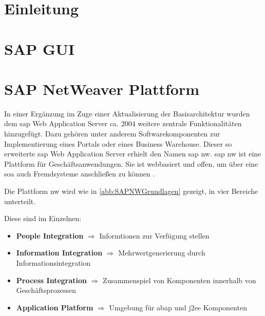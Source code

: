 \section{Einleitung}

\section{SAP GUI}
\label{sec:sapgui}

\section{SAP NetWeaver Plattform}
\label{sec:netweaver}
In einer Ergänzung im Zuge einer Aktualisierung der Basisarchitektur wurden dem \gls{sap} Web Application Server ca. 2004 weitere zentrale Funktionalitäten hinzugefügt. Dazu gehören unter anderem Softwarekomponenten zur Implementierung eines Portals oder eines Business Warehouse. Dieser so erweiterte \gls{sap} Web Application Server erhielt den Namen \gls{sap} \gls{nw}. \gls{sap} \gls{nw} ist eine Plattform für Geschäftsanwendungen. Sie ist webbasiert und offen, um über eine \gls{soa} auch Fremdsysteme anschließen zu können \cite{saptec}.

Die Plattform \gls{nw} wird wie in \ref{abb:SAPNWGrundlagen} gezeigt, in vier Bereiche unterteilt.

Diese sind im Einzelnen:
\begin{itemize}
	\item \textbf{People Integration} $\Rightarrow$ Informtionen zur Verfügung stellen
	\item \textbf{Information Integration} $\Rightarrow$ Mehrwertgenerierung durch Informationsintegration
	\item \textbf{Process Integration} $\Rightarrow$ Zusammenspiel von Komponenten innerhalb von Geschäftsprozessen
	\item \textbf{Application Platform} $\Rightarrow$ Umgebung für \gls{abap} und \gls{j2ee} Komponenten
\end{itemize}

